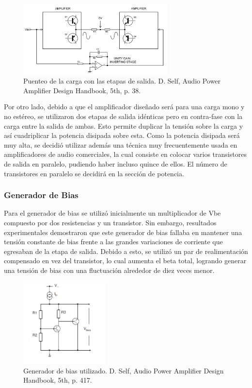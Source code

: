 \begin{figure}[H]
\centering
	\includegraphics[width=0.7\textwidth]{ImagenesOutput-Stage/pag38-bridge.png}
	\caption{Puenteo de la carga con las etapas de salida. D. Self, Audio Power Amplifier Design Handbook, 5th, p. 38.}
	\label{fig:bridge}
\end{figure}

Por otro lado, debido a que el amplificador diseñado será para una carga mono y no estéreo, se utilizaron dos etapas de salida idénticas pero en contra-fase con la carga entre la salida de ambas. Esto permite duplicar la tensión sobre la carga y así cuadriplicar la potencia disipada sobre esta.
Como la potencia disipada será muy alta, se decidió utilizar además una técnica muy frecuentemente usada en amplificadores de audio comerciales, la cual consiste en colocar varios transistores de salida en paralelo, pudiendo haber incluso quince de ellos. El número de transistores en paralelo se decidirá en la sección de potencia.



\subsubsection{Generador de Bias}

Para el generador de bias se utilizó inicialmente un multiplicador de Vbe compuesto por dos resistencias y un transistor. Sin embargo, resultados experimentales demostraron que este generador de bias fallaba en mantener una tensión constante de bias frente a las grandes variaciones de corriente que egresaban de la etapa de salida. Debido a esto, se utilizó un par de realimentación compensado en vez del transistor, lo cual aumenta el beta total, logrando generar una tensión de bias con una fluctuación alrededor de diez veces menor.

\begin{figure}[H]
\centering
	\includegraphics[width=0.4\textwidth]{ImagenesOutput-Stage/pag417-bias.png}
	\caption{Generador de bias utilizado. D. Self, Audio Power Amplifier Design Handbook, 5th, p. 417.}
	\label{fig:bias}
\end{figure}


